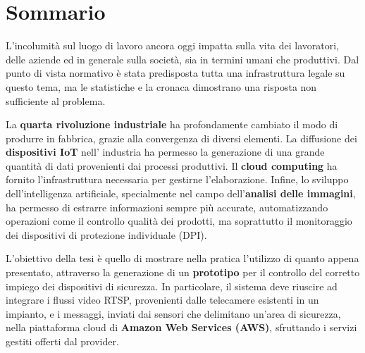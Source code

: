 \chapter*{Sommario}

\vspace{1cm}
L'incolumità sul luogo di lavoro ancora oggi impatta sulla vita dei lavoratori, delle aziende ed in generale sulla società, sia in termini umani che produttivi. Dal punto di vista normativo è stata predisposta tutta una infrastruttura legale su questo tema, ma le statistiche e la cronaca dimostrano una risposta non sufficiente al problema.  
\vspace{0.7cm}


\noindent La \textbf{quarta rivoluzione industriale} ha profondamente cambiato il modo di produrre in fabbrica, grazie alla convergenza di diversi elementi. La diffusione dei \textbf{dispositivi IoT} nell' industria ha permesso la generazione di una grande quantità di dati provenienti dai processi produttivi. Il \textbf{cloud computing} ha fornito l'infrastruttura necessaria per gestirne l'elaborazione. Infine, lo sviluppo dell'intelligenza artificiale, specialmente nel campo dell'\textbf{analisi delle immagini}, ha permesso di estrarre informazioni sempre più accurate, automatizzando operazioni come il controllo qualità dei prodotti, ma soprattutto il monitoraggio dei dispositivi di protezione individuale (DPI).
\vspace{0.7cm}

\noindent L'obiettivo della tesi è quello di mostrare nella pratica l'utilizzo di quanto appena presentato, attraverso la generazione di un \textbf{prototipo} per il controllo del corretto impiego dei dispositivi di sicurezza. In particolare, il sistema deve riuscire ad integrare i flussi video RTSP, provenienti dalle telecamere esistenti in un impianto, e i messaggi, inviati dai sensori che delimitano un'area di sicurezza, nella piattaforma cloud di \textbf{Amazon Web Services (AWS)}, sfruttando i servizi gestiti offerti dal provider. 


